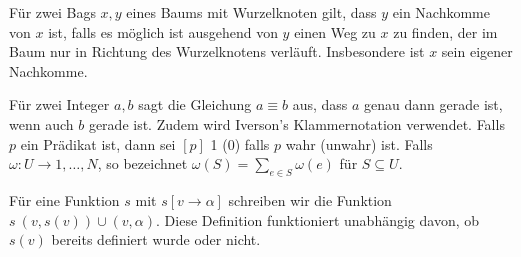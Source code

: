 Für zwei Bags $x,y$ eines Baums mit Wurzelknoten gilt, dass $y$ ein Nachkomme von $x$ ist, falls es möglich ist ausgehend von $y$ einen Weg zu $x$ zu finden, der im Baum nur in Richtung des Wurzelknotens verläuft. 
Insbesondere ist $x$ sein eigener Nachkomme.

Für zwei Integer $a,b$ sagt die Gleichung $a \equiv b$ aus, dass $a$ genau dann gerade ist, wenn auch $b$ gerade ist.
Zudem wird Iverson's Klammernotation verwendet. 
Falls $p$ ein Prädikat ist, dann sei $[p]$ 1 (0) falls $p$ wahr (unwahr) ist.
Falls $\omega:U\rightarrow {1,\dots,N}$, so bezeichnet $\omega(S)=\sum_{e\in S} \omega(e)$ für $S \subseteq U$.

Für eine Funktion $s$ mit $s[v \rightarrow \alpha]$ schreiben wir die Funktion $s \ {(v,s(v))}\cup{(v,\alpha)}$. Diese Definition funktioniert unabhängig davon, ob $s(v)$ bereits definiert wurde oder nicht.
